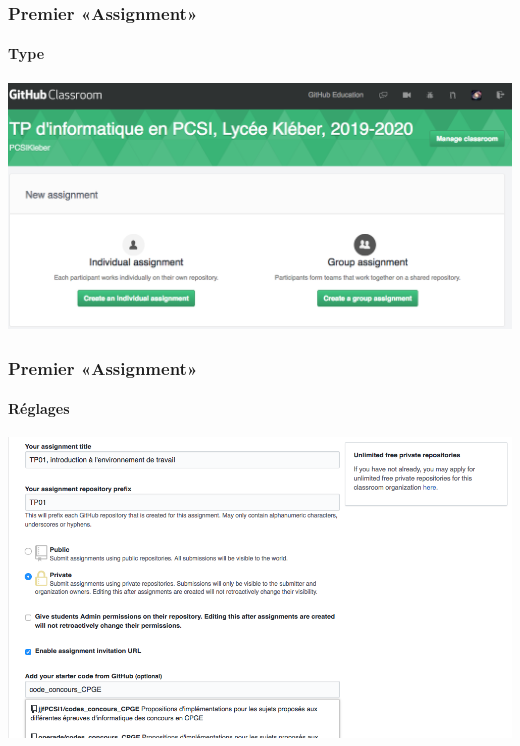 \begin{frame}
	\frametitle{Premier «Assignment»}
	\framesubtitle{Type}


	\begin{center}
		\includegraphics[width=\linewidth]{figures/classroom_assignment_type.png}
	\end{center}

\end{frame}

\begin{frame}
	\frametitle{Premier «Assignment»}
	\framesubtitle{Réglages}

	\begin{center}
		\includegraphics[height=0.8\textheight]{figures/classroom_assignment_reglages.png}
	\end{center}

\end{frame}

